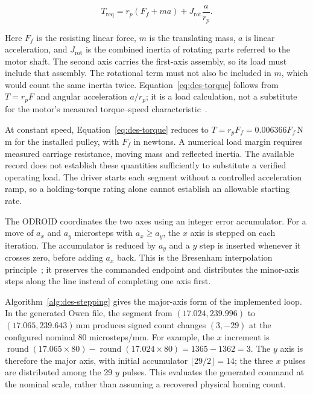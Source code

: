 \begin{equation}
T_{\mathrm{req}}=r_p(F_f+ma)+J_{\mathrm{rot}}\frac{a}{r_p}.
\label{eq:des-torque}
\end{equation}

Here $F_f$ is the resisting linear force, $m$ is the translating mass, $a$ is linear acceleration, and $J_{\mathrm{rot}}$ is the combined inertia of rotating parts referred to the motor shaft. The second axis carries the first-axis assembly, so its load must include that assembly. The rotational term must not also be included in $m$, which would count the same inertia twice. Equation~\ref{eq:des-torque} follows from $T=r_pF$ and angular acceleration $a/r_p$; it is a load calculation, not a substitute for the motor's measured torque--speed characteristic~\cite{acarnley2002}.

At constant speed, Equation~\ref{eq:des-torque} reduces to $T=r_pF_f=0.006366F_f$\,N\,m for the installed pulley, with $F_f$ in newtons. A numerical load margin requires measured carriage resistance, moving mass and reflected inertia. The available record does not establish these quantities sufficiently to substitute a verified operating load. The driver starts each segment without a controlled acceleration ramp, so a holding-torque rating alone cannot establish an allowable starting rate.

The ODROID coordinates the two axes using an integer error accumulator. For a move of $a_x$ and $a_y$ microsteps with $a_x\geq a_y$, the $x$ axis is stepped on each iteration. The accumulator is reduced by $a_y$ and a $y$ step is inserted whenever it crosses zero, before adding $a_x$ back. This is the Bresenham interpolation principle~\cite[p.~28]{bresenham1965}; it preserves the commanded endpoint and distributes the minor-axis steps along the line instead of completing one axis first.

Algorithm~\ref{alg:des-stepping} gives the major-axis form of the implemented loop. In the generated Owen file, the segment from $(17.024,239.996)$ to $(17.065,239.643)$\,mm produces signed count changes $(3,-29)$ at the configured nominal 80 microsteps/mm. For example, the $x$ increment is $\operatorname{round}(17.065\times80)-\operatorname{round}(17.024\times80)=1365-1362=3$. The $y$ axis is therefore the major axis, with initial accumulator $\lfloor29/2\rfloor=14$; the three $x$ pulses are distributed among the 29 $y$ pulses. This evaluates the generated command at the nominal scale, rather than assuming a recovered physical homing count.

